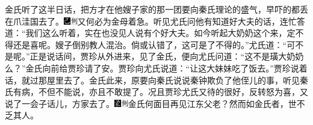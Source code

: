 金氏听了这半日话，把方才在他嫂子家的那一团要向秦氏理论的盛气，早吓的都丢在爪洼国去了。{\includegraphics[width=3mm]{../Images/00003}\includegraphics[width=3mm]{../Images/00011}\footnotesize \kaishu 又何必为金母着急。}听见尤氏问他有知道好大夫的话，连忙答道：``我们这么听着，实在也没见人说有个好大夫。如今听起大奶奶这个来，定不得还是喜呢。嫂子倒别教人混治。倘或认错了，这可是了不得的。''尤氏道：``可不是呢。''正是说话间，贾珍从外进来，见了金氏，便向尤氏问道：``这不是璜大奶奶么？''金氏向前给贾珍请了安。贾珍向尤氏说道：``让这大妹妹吃了饭去。''贾珍说着话，就过那屋里去了。金氏此来，原要向秦氏说说秦钟欺负了他侄儿的事，听见秦氏有病，不但不能说，亦且不敢提了。况且贾珍尤氏又待的很好，反转怒为喜，又说了一会子话儿，方家去了。{\includegraphics[width=3mm]{../Images/00006}\includegraphics[width=3mm]{../Images/00011}\footnotesize \kaishu 金氏何面目再见江东父老？然而如金氏者，世不乏其人。}

